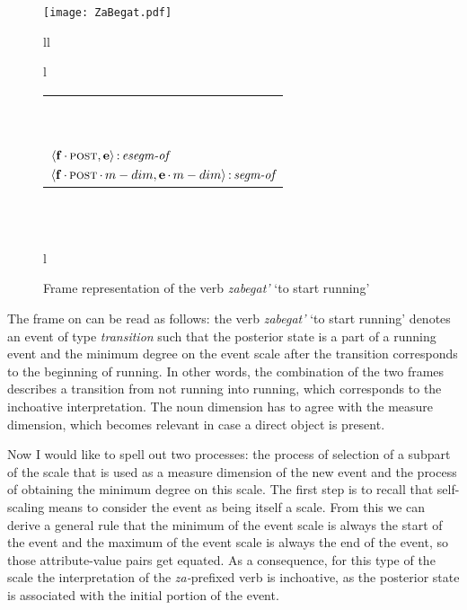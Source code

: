 \begin{figure}
\centering
\texttt{[image: ZaBegat.pdf]}\\
\begin{tabular}[t]{ll}
\begin{tabular}[t]{l}
\\
\end{tabular}
\begin{footnotesize}
\begin{tabular}{l}
~\\
~\\
$\langle{\textbf{\textrm{f}}\,{\cdot}\,\textsc{post},\textbf{\textrm{e}}}\rangle\,{:}\,\textit{esegm-of}$\\
$\tuple{\btag{f}\BC\POST\C\MDIM,\btag{e}\BC\MDIM}\D\type{segm-of}$\\
\end{tabular}
\end{footnotesize}
\\\\
\begin{tabular}[t]{l}
\\
\end{tabular}
\end{tabular}
\hfill
\caption{Frame representation of the verb \textit{zabegat'} `to start running'}
\label{frame:zabegat}
\end{figure}

The frame on  can be read as follows: the verb \textit{zabegat'} `to start running' denotes an event of type \textit{transition} such that the posterior state is a part of a running event and the minimum degree on the event scale after the transition corresponds to the beginning of running. In other words, the combination of the two frames describes a transition from not running into running, which corresponds to the inchoative interpretation. The noun dimension has to agree with the measure dimension, which becomes relevant in case a direct object is present.

Now I would like to spell out two processes: the process of selection of a subpart of the scale that is used as a measure dimension of the new event and the process of obtaining the minimum degree on this scale. The first step is to recall that self-scaling means to consider the event as being itself a scale. From this we can derive a general rule that the minimum of the event scale is always the start of the event and the maximum of the event scale is always the end of the event, so those attribute-value pairs get equated. As a consequence, for this type of the scale the interpretation of the \textit{za-}prefixed verb is inchoative, as the posterior state is associated with the initial portion of the event.

